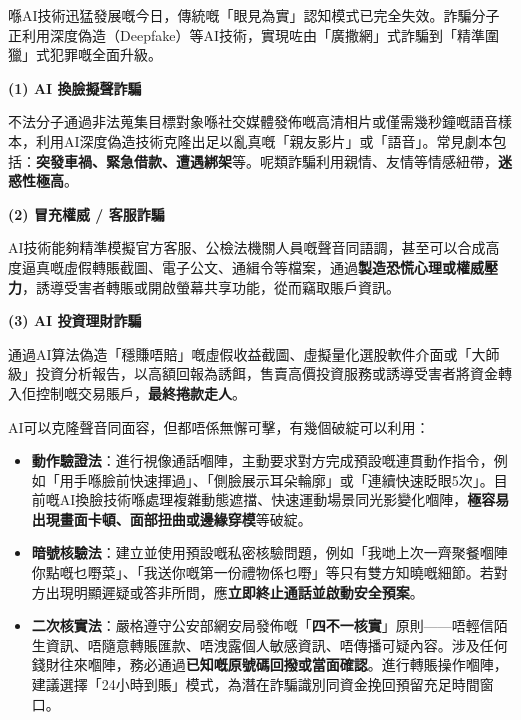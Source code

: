 
喺AI技術迅猛發展嘅今日，傳統嘅「眼見為實」認知模式已完全失效。詐騙分子正利用深度偽造（Deepfake）等AI技術，實現咗由「廣撒網」式詐騙到「精準圍獵」式犯罪嘅全面升級。


\textbf{(1) AI 換臉擬聲詐騙}\par

不法分子通過非法蒐集目標對象喺社交媒體發佈嘅高清相片或僅需幾秒鐘嘅語音樣本，利用AI深度偽造技術克隆出足以亂真嘅「親友影片」或「語音」。常見劇本包括：\textbf{突發車禍、緊急借款、遭遇綁架}等。呢類詐騙利用親情、友情等情感紐帶，\textbf{迷惑性極高}。

\textbf{(2) 冒充權威 / 客服詐騙}\par

AI技術能夠精準模擬官方客服、公檢法機關人員嘅聲音同語調，甚至可以合成高度逼真嘅虛假轉賬截圖、電子公文、通緝令等檔案，通過\textbf{製造恐慌心理或權威壓力}，誘導受害者轉賬或開啟螢幕共享功能，從而竊取賬戶資訊。

\textbf{(3) AI 投資理財詐騙}\par

通過AI算法偽造「穩賺唔賠」嘅虛假收益截圖、虛擬量化選股軟件介面或「大師級」投資分析報告，以高額回報為誘餌，售賣高價投資服務或誘導受害者將資金轉入佢控制嘅交易賬戶，\textbf{最終捲款走人}。


AI可以克隆聲音同面容，但都唔係無懈可擊，有幾個破綻可以利用：

\begin{itemize}
  \item \textbf{動作驗證法}：進行視像通話嗰陣，主動要求對方完成預設嘅連貫動作指令，例如「用手喺臉前快速揮過」、「側臉展示耳朵輪廓」或「連續快速眨眼5次」。目前嘅AI換臉技術喺處理複雜動態遮擋、快速運動場景同光影變化嗰陣，\textbf{極容易出現畫面卡頓、面部扭曲或邊緣穿模}等破綻。
  \item \textbf{暗號核驗法}：建立並使用預設嘅私密核驗問題，例如「我哋上次一齊聚餐嗰陣你點嘅乜嘢菜」、「我送你嘅第一份禮物係乜嘢」等只有雙方知曉嘅細節。若對方出現明顯遲疑或答非所問，應\textbf{立即終止通話並啟動安全預案}。
  \item \textbf{二次核實法}：嚴格遵守公安部網安局發佈嘅「\textbf{四不一核實}」原則——唔輕信陌生資訊、唔隨意轉賬匯款、唔洩露個人敏感資訊、唔傳播可疑內容。涉及任何錢財往來嗰陣，務必通過\textbf{已知嘅原號碼回撥或當面確認}。進行轉賬操作嗰陣，建議選擇「24小時到賬」模式，為潛在詐騙識別同資金挽回預留充足時間窗口。
\end{itemize}

